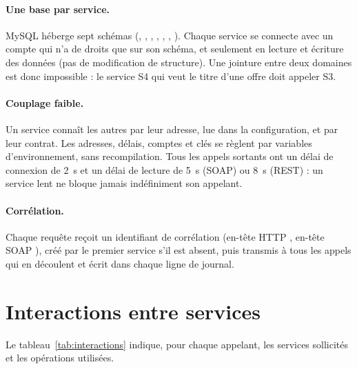 \paragraph{Une base par service.} MySQL héberge sept schémas (, , , , , , ). Chaque service se connecte avec un compte qui n'a de droits que sur son schéma, et seulement en lecture et écriture des données (pas de modification de structure). Une jointure entre deux domaines est donc impossible : le service S4 qui veut le titre d'une offre doit appeler S3.

\paragraph{Couplage faible.} Un service connaît les autres par leur adresse, lue dans la configuration, et par leur contrat. Les adresses, délais, comptes et clés se règlent par variables d'environnement, sans recompilation. Tous les appels sortants ont un délai de connexion de 2~s et un délai de lecture de 5~s (SOAP) ou 8~s (REST) : un service lent ne bloque jamais indéfiniment son appelant.

\paragraph{Corrélation.} Chaque requête reçoit un identifiant de corrélation (en-tête HTTP , en-tête SOAP ), créé par le premier service s'il est absent, puis transmis à tous les appels qui en découlent et écrit dans chaque ligne de journal.

\section{Interactions entre services}

Le tableau~\ref{tab:interactions} indique, pour chaque appelant, les services sollicités et les opérations utilisées.

